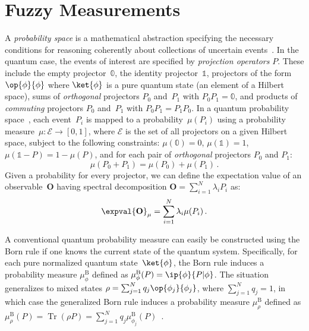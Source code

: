 \documentclass[english,reprint, aps, prl,superscriptaddress, showpacs,
showkeys, longbibliography, amsmath, amssymb, floatfix]{revtex4-1}
\theoremstyle{plain}
\theoremstyle{definition}
\newcommand{\events}{\ensuremath{\mathcal{E}}}
\newcommand{\proj}[1]{\op{#1}{#1}}
\newcommand{\Tr}{\ensuremath{\mathop{\mathrm{Tr}}\nolimits}}
\begin{document}
\section{Fuzzy Measurements}
\label{sec:fuzzy}

A \emph{probability space} is a mathematical abstraction specifying
the necessary conditions for reasoning coherently about collections of
uncertain
events~\cite{Kolmogorov1950,544199,Griffiths2003,Grabisch2016}. In the
quantum case, the events of interest are specified by \emph{projection
  operators} $P$. These include the empty projector~$\mathbb{0}$, the
identity projector~$\mathbb{1}$, projectors of the form $\proj{\phi}$
where $\ket{\phi}$ is a pure quantum state (an element of a Hilbert
space), sums of \emph{orthogonal} projectors $P_0$ and~$P_1$ with
$P_0P_1=\mathbb{0}$, and products of \emph{commuting} projectors $P_0$
and~$P_1$ with $P_0P_1=P_1P_0$. In a quantum probability
space~\cite{10.2307/2308516,gleason1957,Redhead1987-REDINA,Maassen2010},
each event~$P_{i}$ is mapped to a probability~$\mu(P_{i})$ using a
probability measure~$\mu:\events\rightarrow[0,1]$, where $\events$ is
the set of all projectors on a given Hilbert space, subject to the
following constraints: $\mu(\mathbb{0})=0$, $\mu(\mathbb{1})=1$,
$\mu\left(\mathbb{1}-P\right)=1-\mu\left(P\right)$, and for each pair
of \emph{orthogonal} projectors $P_{0}$ and $P_{1}$:
\begin{equation}
{\mu}\left(P_{0}+P_{1}\right)={\mu}\left(P_{0}\right)+{\mu}\left(P_{1}\right)\,.\label{eq:QuantumProbability-Addition}
\end{equation}
Given a probability for every projector, we can define the
expectation value of an observable~$\mathbf{O}$ having spectral
decomposition $\mathbf{O}=\sum_{i=1}^{N}\lambda_{i}P_{i}$ as:
\begin{equation}
\expval{\mathbf{O}}_{\mu}=\sum_{i=1}^{N}\lambda_{i}\mu(P_{i})\,.\label{eq:quantum-expectation}
\end{equation}

A conventional quantum probability measure can easily be
constructed using the Born rule if one knows the current state of the quantum
system.  Specifically, for each pure normalized quantum
state~$\ket{\phi}$, the Born rule induces a probability measure
$\mu_{\phi}^{\mathrm{B}}$ defined as
$\mu_{\phi}^{\mathrm{B}}(P)=\ip{\phi}{P\vert\phi}$. The situation
generalizes to mixed states
$\rho = \sum_{j=1}^{N}q_{j}\proj{\phi_{j}}$, where
$\sum_{j=1}^{N}q_{j}=1$, in which case the generalized Born rule
induces a probability measure $\mu_{\rho}^{\mathrm{B}}$ defined as
$\mu_{\rho}^{\mathrm{B}}\left(P\right) = \Tr\left(\rho P\right) =
\sum_{j=1}^{N}
q_{j}\mu_{\phi_{j}}^{\mathrm{B}}\left(P\right)$~\cite{peres1995quantum,544199,Jaeger2007}.
\end{document}
